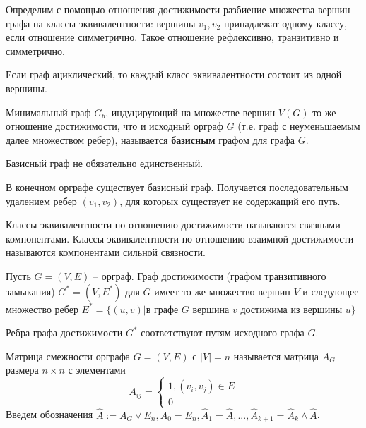 	\begin{Def}
		Определим с помощью отношения достижимости разбиение множества вершин графа на классы эквивалентности: вершины $v_1, v_2$ принадлежат одному классу, если отношение симметрично.
		Такое отношение рефлексивно, транзитивно и симметрично.
	\end{Def}

	\begin{Rem}
		Если граф ациклический, то каждый класс эквивалентности состоит из одной вершины.
	\end{Rem}

	
	\begin{Def}
		Минимальный граф $G_b$, индуцирующий на множестве вершин $V(G)$ то же отношение достижимости,
		что и исходный орграф $G$ (т.е. граф с неуменьшаемым далее множеством ребер), называется \textbf{базисным} графом для графа $G$.  
	\end{Def}

	\begin{Rem}
		Базисный граф не обязательно единственный.
	\end{Rem}

	\begin{Rem}
		В конечном орграфе существует базисный граф. Получается последовательным удалением ребер $(v_1, v_2)$, для которых существует не содержащий его путь.
	\end{Rem}

	\begin{Def}
		Классы эквивалентности по отношению достижимости называются связными компонентами. Классы эквивалентности по отношению взаимной достижимости называются компонентами сильной связности.
	\end{Def}

	\begin{Def}
		Пусть $G = (V, E)$ -- орграф. Граф достижимости (графом транзитивного замыкания) $G^* = (V, E^*)$ для $G$ 
		имеет то же множество вершин $V$ и следующее множество ребер $E^* = \{(u, v) | \text{в графе } G \text{ вершина } v \text{ достижима из вершины } u\}$ 
	\end{Def}

	\begin{Rem}
		Ребра графа достижимости $G^*$ соответствуют путям исходного графа $G$.
	\end{Rem}

	\begin{Def}
		Матрица смежности орграфа $G = (V, E)$ с $|V| = n$ называется матрица $A_G$ размера $n \times n$ с элементами 
		\[A_{ij} = \begin{cases}
			1, (v_i, v_j) \in E \\
			0
		\end{cases}\]
		Введем обозначения $\hat{A} := A_G \vee E_n, \hat{A}_0 = E_n, \hat{A}_1 = \hat{A}, ..., \hat{A}_{k + 1} = \hat{A}_k \wedge \hat{A}$. 
	\end{Def}

